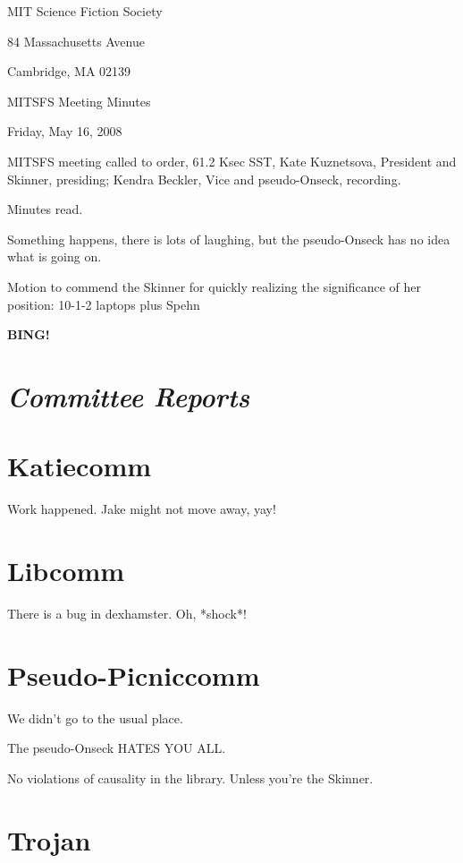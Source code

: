 \documentclass[10pt]{article}
\newcommand{\bing}{{\bf BING!} }
\newcommand{\goto}[1]{\bing \vskip 12pt \section*{{\em{#1}}}}
\newcommand{\ps}{ plus Spehn\xspace}
\begin{document}
\begin{center}

MIT Science Fiction Society

84 Massachusetts Avenue

Cambridge, MA 02139

\vspace{12pt}

MITSFS Meeting Minutes

Friday, May 16, 2008

\end{center}

\vspace{18pt}

\setlength{\parskip}{6pt}

\noindent
MITSFS meeting called to order, 61.2 Ksec SST,
Kate Kuznetsova, President and Skinner, presiding; Kendra Beckler, Vice and pseudo-Onseck, recording.

Minutes read.

Something happens, there is lots of laughing, but the pseudo-Onseck has no idea what is going on.

Motion to commend the Skinner for quickly realizing the significance of her position: 10-1-2 laptops \ps

\BING

\goto{Committee Reports}

\section*{Katiecomm}

Work happened.  Jake might not move away, yay!

\section*{Libcomm}

There is a bug in dexhamster.  Oh, *shock*!

\section*{Pseudo-Picniccomm}

We didn't go to the usual place.

The pseudo-Onseck HATES YOU ALL.

No violations of causality in the library.  Unless you're the Skinner.

\section*{Trojan}
\end{document}
